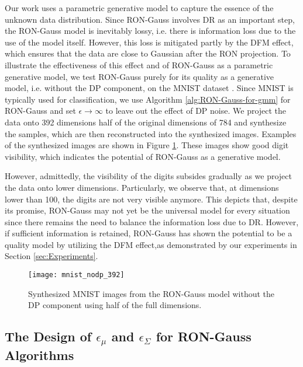 \documentclass[USenglish,oneside,twocolumn]{article}
\theoremstyle{definition}
\theoremstyle{remark}
\theoremstyle{plain}
\theoremstyle{plain}
\begin{document}
Our work uses a parametric generative model to capture the essence of the unknown data distribution. Since RON-Gauss involves DR as an important step, the RON-Gauss model is inevitably lossy, i.e. there is information loss due to the use of the model itself. However, this loss is mitigated partly by the DFM effect, which ensures that the data are close to Gaussian after the RON projection. To illustrate the effectiveness of this effect and of RON-Gauss as a parametric generative model, we test RON-Gauss purely for its quality as a generative model, i.e. without the DP component, on the MNIST dataset \cite{RefWorks:541,lecun-mnist}. 
Since MNIST is typically used for classification, we use Algorithm \ref{alg:RON-Gauss-for-gmm} for RON-Gauss and set $\epsilon\rightarrow\infty$ to leave out the effect of DP noise. We project the data onto 392 dimensions \textendash{} half of the original dimensions of 784 \textendash{} and synthesize the samples, which are then reconstructed into the synthesized images. Examples of the synthesized images are shown in Figure \ref{fig:mnist_ex}. These images show good digit visibility, which indicates the potential of RON-Gauss as a generative model. 

However, admittedly, the visibility of the digits subsides gradually as we project the data onto lower dimensions. Particularly, we observe that, at dimensions lower than 100, the digits are not very visible anymore. This depicts that, despite its promise, RON-Gauss may not yet be the universal model for every situation since there remains the need to balance the information loss due to DR. However, if sufficient information is retained, RON-Gauss has shown the potential to be a quality model by utilizing the DFM effect,as demonstrated by our experiments in Section \ref{sec:Experiments}. 


\begin{figure}
\begin{centering}
\texttt{[image: mnist\_nodp\_392]} 
\par\end{centering}
\caption{Synthesized MNIST images from the RON-Gauss model without the DP component using half of the full dimensions.
\label{fig:mnist_ex}
\vspace{-0.5em}}
\end{figure}

\vspace{-1em}
\subsection{The Design of \texorpdfstring{$\epsilon_{\mu}$}{eps\_mu} and \texorpdfstring{$\epsilon_{\Sigma}$}{eps\_Sigma} for RON-Gauss Algorithms}
\end{document}
